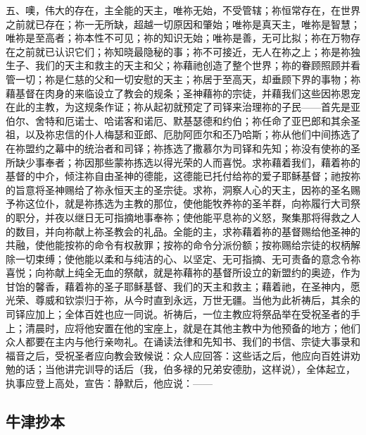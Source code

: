 五、噢，伟大的存在，主全能的天主，唯祢无始，不受管辖；祢恒常存在，在世界之前就已存在；祢一无所缺，超越一切原因和肇始；唯祢是真天主，唯祢是智慧；唯祢是至高者；祢本性不可见；祢的知识无始；唯祢是善，无可比拟；祢在万物存在之前就已认识它们；祢知晓最隐秘的事；祢不可接近，无人在祢之上；祢是祢独生子、我们的天主和救主的天主和父；祢藉祂创造了整个世界；祢的眷顾照顾并看管一切；祢是仁慈的父和一切安慰的天主；祢居于至高天，却垂顾下界的事物；祢藉基督在肉身的来临设立了教会的规条；圣神藉祢的宗徒，并藉我们这些因祢恩宠在此的主教，为这规条作证；祢从起初就预定了司铎来治理祢的子民——首先是亚伯尔、舍特和厄诺士、哈诺客和诺厄、默基瑟德和约伯；祢任命了亚巴郎和其余圣祖，以及祢忠信的仆人梅瑟和亚郎、厄肋阿匝尔和丕乃哈斯；祢从他们中间拣选了在祢盟约之幕中的统治者和司铎；祢拣选了撒慕尔为司铎和先知；祢没有使祢的圣所缺少事奉者；祢因那些蒙祢拣选以得光荣的人而喜悦。求祢藉着我们，藉着祢的基督的中介，倾注祢自由圣神的德能，这德能已托付给祢的爱子耶稣基督；祂按祢的旨意将圣神赐给了祢永恒天主的圣宗徒。求祢，洞察人心的天主，因祢的圣名赐予祢这位仆，就是祢拣选为主教的那位，使他能牧养祢的圣羊群，向祢履行大司祭的职分，并夜以继日无可指摘地事奉祢；使他能平息祢的义怒，聚集那将得救之人的数目，并向祢献上祢圣教会的礼品。全能的主，求祢藉着祢的基督赐给他圣神的共融，使他能按祢的命令有权赦罪；按祢的命令分派份额；按祢赐给宗徒的权柄解除一切束缚；使他能以柔和与纯洁的心、以坚定、无可指摘、无可责备的意念令祢喜悦；向祢献上纯全无血的祭献，就是祢藉祢的基督所设立的新盟约的奥迹，作为甘饴的馨香，藉着祢的圣子耶稣基督、我们的天主和救主；藉着祂，在圣神内，愿光荣、尊威和钦崇归于祢，从今时直到永远，万世无疆。当他为此祈祷后，其余的司铎应加上；全体百姓也应一同说。祈祷后，一位主教应将祭品举在受祝圣者的手上；清晨时，应将他安置在他的宝座上，就是在其他主教中为他预备的地方；他们众人都要在主内与他行亲吻礼。在诵读法律和先知书、我们的书信、宗徒大事录和福音之后，受祝圣者应向教会致候说：众人应回答：这些话之后，他应向百姓讲劝勉的话；当他讲完训导的话后（我，伯多禄的兄弟安德肋，这样说），全体起立，执事应登上高处，宣告：静默后，他应说：——\par


\subsection{牛津抄本}

